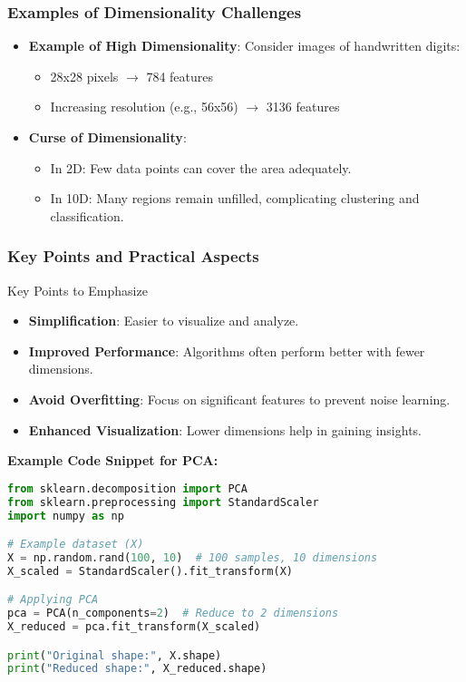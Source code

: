 \documentclass[aspectratio=169]{beamer}
\begin{document}
\begin{frame}[fragile]
  \frametitle{Examples of Dimensionality Challenges}
  \begin{itemize}
      \item \textbf{Example of High Dimensionality}: 
      Consider images of handwritten digits:
      \begin{itemize}
          \item 28x28 pixels $\rightarrow$ 784 features
          \item Increasing resolution (e.g., 56x56) $\rightarrow$ 3136 features
      \end{itemize}
      \item \textbf{Curse of Dimensionality}:
      \begin{itemize}
          \item In 2D: Few data points can cover the area adequately.
          \item In 10D: Many regions remain unfilled, complicating clustering and classification.
      \end{itemize}
  \end{itemize}
\end{frame}

\begin{frame}[fragile]
  \frametitle{Key Points and Practical Aspects}
  \begin{block}{Key Points to Emphasize}
      \begin{itemize}
          \item \textbf{Simplification}: Easier to visualize and analyze.
          \item \textbf{Improved Performance}: Algorithms often perform better with fewer dimensions.
          \item \textbf{Avoid Overfitting}: Focus on significant features to prevent noise learning.
          \item \textbf{Enhanced Visualization}: Lower dimensions help in gaining insights.
      \end{itemize}
  \end{block}
  
  \vspace{1em} %
  \textbf{Example Code Snippet for PCA:}
  \begin{lstlisting}[language=Python]
from sklearn.decomposition import PCA
from sklearn.preprocessing import StandardScaler
import numpy as np

# Example dataset (X)
X = np.random.rand(100, 10)  # 100 samples, 10 dimensions
X_scaled = StandardScaler().fit_transform(X)

# Applying PCA
pca = PCA(n_components=2)  # Reduce to 2 dimensions
X_reduced = pca.fit_transform(X_scaled)

print("Original shape:", X.shape)
print("Reduced shape:", X_reduced.shape)
  \end{lstlisting}
\end{frame}
\end{document}
